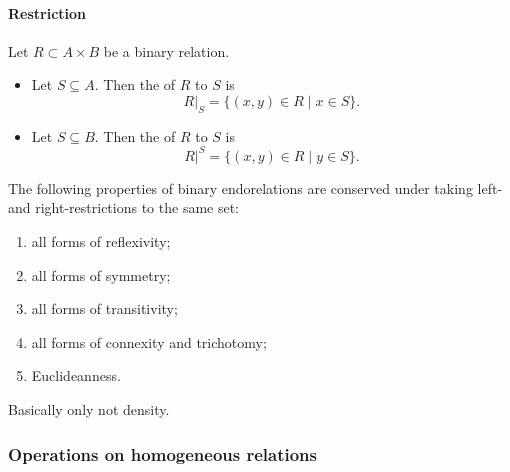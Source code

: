\paragraph{Restriction}
\begin{definition}
Let $R\subset A\times B$ be a binary relation.
\begin{itemize}
\item Let $S\subseteq A$. Then the  of $R$ to $S$ is
\[ \left.R\right|_S = \{ (x,y)\in R \;|\; x\in S \}. \]
\item Let $S\subseteq B$. Then the  of $R$ to $S$ is
\[ \left.R\right|^S = \{ (x,y)\in R \;|\; y\in S \}. \]
\end{itemize}
\end{definition}
\begin{lemma} \label{lemma:relationPropertiesRestriction}
The following properties of binary endorelations are conserved under taking left- and right-restrictions to the same set:
\begin{enumerate}
\item all forms of reflexivity;
\item all forms of symmetry;
\item all forms of transitivity;
\item all forms of connexity and trichotomy;
\item Euclideanness.
\end{enumerate}
\end{lemma}
Basically only not density.

\subsubsection{Operations on homogeneous relations}
